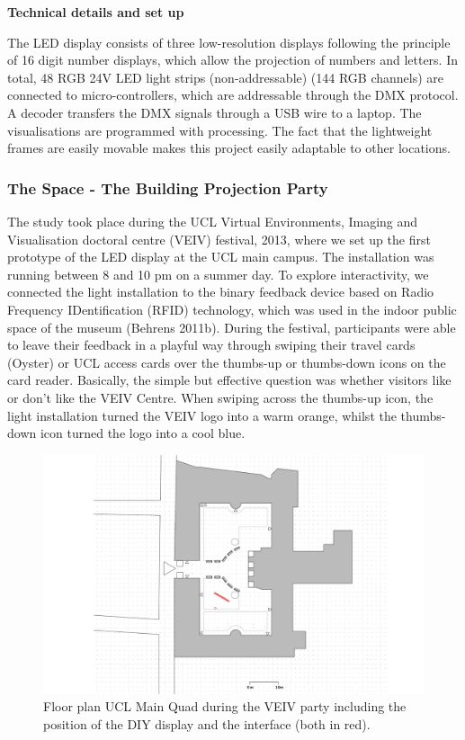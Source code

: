 \textbf{Technical details and set up}

The LED display consists of three low-resolution displays following the principle of 16 digit number displays, which allow the projection of numbers and letters.
In total, 48 RGB 24V LED light strips (non-addressable) (144 RGB channels) are connected to micro-controllers, which are addressable through the DMX protocol. A decoder transfers the DMX signals through a USB wire to a laptop. The visualisations are programmed with processing. The fact that the lightweight frames are easily movable makes this project easily adaptable to other locations.




\subsubsection{The Space - The Building Projection Party}
The study took place during the UCL Virtual Environments, Imaging and Visualisation doctoral centre (VEIV) festival, 2013, where we set up the first prototype of the LED display at the UCL main campus. 
The installation was running between 8 and 10 pm on a summer day. 
To explore interactivity, we connected the light installation to the binary feedback device based on Radio Frequency IDentification (RFID) technology, which was used in the indoor public space of the museum \cite{Behrens_2011} (Behrens 2011b). During the festival, participants were able to leave their feedback in a playful way through swiping their travel cards (Oyster) or UCL access cards over the thumbs-up or thumbs-down icons on the card reader.
Basically, the simple but effective question was whether visitors like or don’t like the VEIV Centre. When swiping across the thumbs-up icon, the light installation turned the VEIV logo into a warm orange, whilst the thumbs-down icon turned the logo into a cool blue.

\begin{figure}[!h] 
\centering
\includegraphics[width=\textwidth]{Illustrations/VEIV_floorplan.png}
\caption [Floor plan UCL Main Quad] {Floor plan UCL Main Quad during the VEIV party including the position of the DIY display and the interface (both in red).}
\label{VEIVfloorplan}
\end{figure}


